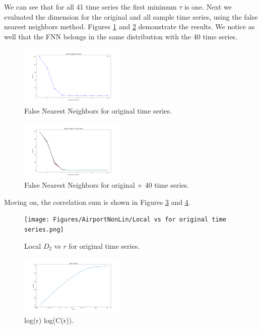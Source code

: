 \documentclass[conference]{IEEEtran}
\begin{document}
We can see that for all 41 time series the first minimum $\tau$ is one. Next we evaluated the dimension for the original and all sample time series, using the false nearest neighbors method. Figures \ref{dima} and \ref{dimalla} demonstrate the results. We notice as well that the FNN belongs in the same distribution with the 40 time series.

\begin{figure}[ht]
    \centering
    \includegraphics[width=0.45\textwidth]{Figures/AirportNonLin/FNN for original time series.png}
    \caption{False Nearest Neighbors for original time series.}
    \label{dima}
\end{figure}

\begin{figure}[ht]
    \centering
    \includegraphics[width=0.45\textwidth]{Figures/AirportNonLin/FNN for original + 40 time series.png}
    \caption{False Nearest Neighbors for original + 40 time series.}
    \label{dimalla}
\end{figure}
\vspace{8mm}

Moving on, the correlation sum is shown in Figures \ref{corsuma} and \ref{corloga}.
\vspace{20mm}

\begin{figure}[ht]
    \centering
    \texttt{[image: Figures/AirportNonLin/Local vs for original time series.png]}
    \caption{Local $D_2$ vs $r$ for original time series.}
    \label{corsuma}
\end{figure}

\begin{figure}[ht]
    \centering
    \includegraphics[width=0.45\textwidth]{Figures/AirportNonLin/log(r), log(C(r)).png}
    \caption{log(r) log(C(r)).}
    \label{corloga}
\end{figure}
\end{document}
